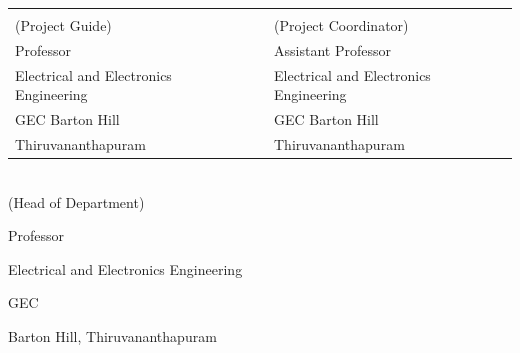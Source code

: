 \begin{singlespace}
	\vspace*{1.2cm}
	\begin{table}[h!]
		\centering
		\begin{tabular}{p{7cm} p{0.9cm} p{7cm}} 
			\textbf{\Supervisor} && \textbf{\Supervisorb} \\
			(Project Guide) &&  (Project Coordinator)\\
                Professor && Assistant Professor\\
			Electrical and Electronics Engineering && Electrical and Electronics Engineering\\ 
			GEC Barton Hill && GEC Barton Hill\\
			Thiruvananthapuram && Thiruvananthapuram\\
		\end{tabular}
		
	\end{table}
	
	\vspace*{1cm}
	
	\begin{center}
		\centering
		
		\textbf{\Supervisora} \\ 
		(Head of Department)
  
            Professor
		
		Electrical and Electronics Engineering
		
		GEC
		
		Barton Hill, Thiruvananthapuram
		
	\end{center}
\end{singlespace}


\thispagestyle{empty}